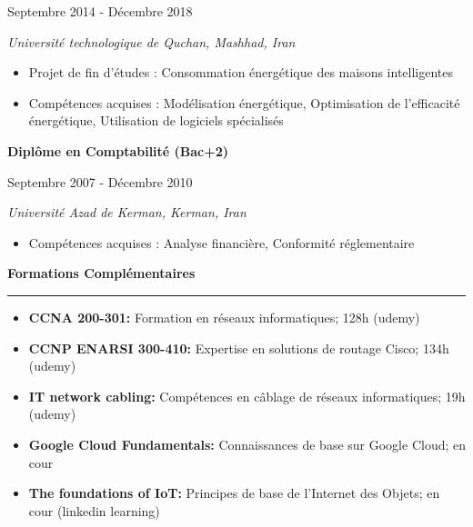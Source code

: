 \documentclass[a4paper]{letter}
\newcommand{\divider}{\rule{\linewidth}{0.9pt}}
\begin{document}
\begin{minipage}[t]{0.60\textwidth}
{\footnotesize Septembre 2014 - Décembre 2018}

{\textit{Université technologique de Quchan, Mashhad, Iran}}

\vspace{1mm}

\begin{itemize}
    \footnotesize
    \item Projet de fin d'études : Consommation énergétique des maisons intelligentes
    \item Compétences acquises : Modélisation énergétique, Optimisation de l'efficacité énergétique, Utilisation de logiciels spécialisés
\end{itemize}

\vspace{3mm}

{\textbf{Diplôme en Comptabilité (Bac+2)}}

{\footnotesize Septembre 2007 - Décembre 2010}

{\textit{Université Azad de Kerman, Kerman, Iran}}

\vspace{1mm}
\begin{itemize}


    \footnotesize
    \item Compétences acquises : Analyse financière, Conformité réglementaire
\end{itemize}
\vspace{3mm}

{\large \textbf{Formations Complémentaires}}
\divider
\vspace{4mm}
\begin{itemize}
    \footnotesize \item {\textbf{CCNA 200-301:} Formation en réseaux informatiques; 128h (udemy)}
    \vspace{2mm}
    \footnotesize \item {\textbf{CCNP ENARSI 300-410:} Expertise en solutions de routage Cisco; 134h (udemy)}
    \vspace{2mm}
    \footnotesize \item {\textbf{IT network cabling:} Compétences en câblage de réseaux informatiques; 19h (udemy)}
    \vspace{2mm}
    \footnotesize \item {\textbf{Google Cloud Fundamentals:} Connaissances de base sur Google Cloud; en cour}
    \vspace{2mm}
    \footnotesize \item {\textbf{The foundations of IoT:} Principes de base de l'Internet des Objets; en cour (linkedin learning)}
    


\end{itemize}
\end{minipage}
\end{document}
